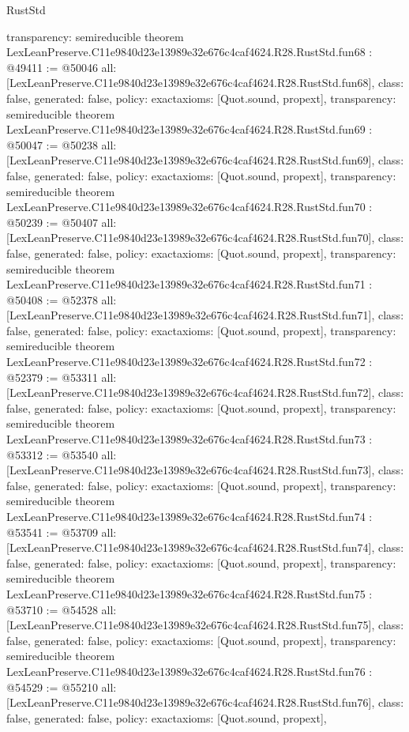 \begin{lexlean}{RustStd}
\begin{coremodule}
{  transparency: semireducible
}
theorem LexLeanPreserve.C11e9840d23e13989e32e676c4caf4624.R28.RustStd.fun68 : @49411 := @50046 {
  all: [LexLeanPreserve.C11e9840d23e13989e32e676c4caf4624.R28.RustStd.fun68],
  class: false,
  generated: false,
  policy: exact{axioms: [Quot.sound, propext]},
  transparency: semireducible
}
theorem LexLeanPreserve.C11e9840d23e13989e32e676c4caf4624.R28.RustStd.fun69 : @50047 := @50238 {
  all: [LexLeanPreserve.C11e9840d23e13989e32e676c4caf4624.R28.RustStd.fun69],
  class: false,
  generated: false,
  policy: exact{axioms: [Quot.sound, propext]},
  transparency: semireducible
}
theorem LexLeanPreserve.C11e9840d23e13989e32e676c4caf4624.R28.RustStd.fun70 : @50239 := @50407 {
  all: [LexLeanPreserve.C11e9840d23e13989e32e676c4caf4624.R28.RustStd.fun70],
  class: false,
  generated: false,
  policy: exact{axioms: [Quot.sound, propext]},
  transparency: semireducible
}
theorem LexLeanPreserve.C11e9840d23e13989e32e676c4caf4624.R28.RustStd.fun71 : @50408 := @52378 {
  all: [LexLeanPreserve.C11e9840d23e13989e32e676c4caf4624.R28.RustStd.fun71],
  class: false,
  generated: false,
  policy: exact{axioms: [Quot.sound, propext]},
  transparency: semireducible
}
theorem LexLeanPreserve.C11e9840d23e13989e32e676c4caf4624.R28.RustStd.fun72 : @52379 := @53311 {
  all: [LexLeanPreserve.C11e9840d23e13989e32e676c4caf4624.R28.RustStd.fun72],
  class: false,
  generated: false,
  policy: exact{axioms: [Quot.sound, propext]},
  transparency: semireducible
}
theorem LexLeanPreserve.C11e9840d23e13989e32e676c4caf4624.R28.RustStd.fun73 : @53312 := @53540 {
  all: [LexLeanPreserve.C11e9840d23e13989e32e676c4caf4624.R28.RustStd.fun73],
  class: false,
  generated: false,
  policy: exact{axioms: [Quot.sound, propext]},
  transparency: semireducible
}
theorem LexLeanPreserve.C11e9840d23e13989e32e676c4caf4624.R28.RustStd.fun74 : @53541 := @53709 {
  all: [LexLeanPreserve.C11e9840d23e13989e32e676c4caf4624.R28.RustStd.fun74],
  class: false,
  generated: false,
  policy: exact{axioms: [Quot.sound, propext]},
  transparency: semireducible
}
theorem LexLeanPreserve.C11e9840d23e13989e32e676c4caf4624.R28.RustStd.fun75 : @53710 := @54528 {
  all: [LexLeanPreserve.C11e9840d23e13989e32e676c4caf4624.R28.RustStd.fun75],
  class: false,
  generated: false,
  policy: exact{axioms: [Quot.sound, propext]},
  transparency: semireducible
}
theorem LexLeanPreserve.C11e9840d23e13989e32e676c4caf4624.R28.RustStd.fun76 : @54529 := @55210 {
  all: [LexLeanPreserve.C11e9840d23e13989e32e676c4caf4624.R28.RustStd.fun76],
  class: false,
  generated: false,
  policy: exact{axioms: [Quot.sound, propext]},
}
\end{coremodule}
\end{lexlean}
